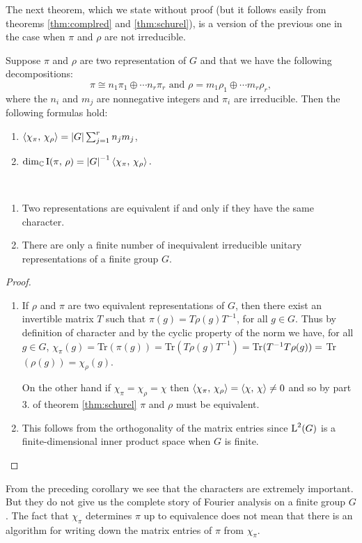 The next theorem, which we state without proof (but it follows easily from theorems \ref{thm:complred} and \ref{thm:schurel}), is a version of the previous one in the case when $\pi$ and $\rho$ are not irreducible.
\begin{theorem}
Suppose $\pi$ and $\rho$ are two representation of $G$ and that we have the following decompositions:
\[
\pi\cong n_1\pi_1\oplus\cdots n_r\pi_r\text{ and $\rho=m_1\rho_1\oplus\cdots m_r\rho_r,$}
\]
where the $n_i$ and $m_j$ are nonnegative integers and $\pi_i$ are irreducible. Then the following formulas hold:
\begin{enumerate}
\item $\braket{\chi_\pi,\, \chi_\rho}=\lvert G\rvert \sum_{j=1}^rn_jm_j$,
\item $ \dim_{\mathbb C}\operatorname{I}(\pi, \, \rho)={\lvert G\rvert}^{-1}\braket{\chi_\pi,\, \chi_\rho}.$
\end{enumerate}
\end{theorem}
\begin{cor}~ 
\begin{enumerate}
\item Two representations are equivalent if and only if they have the same character.
\item There are only a finite number of inequivalent irreducible unitary representations of a finite group $G$.
\end{enumerate}
\end{cor}
\begin{proof}~
\begin{enumerate}
\item If $\rho$ and $\pi$ are two equivalent representations of $G$, then there exist  an invertible matrix $T$ such that $\pi(g)=T\rho(g)T^{-1}$, for all $g\in G$. Thus by definition of character and by the cyclic property of the norm we have, for all $g\in G$, $\chi_\pi(g)=$Tr$(\pi(g))=$Tr$(T\rho(g)T^{-1})=$Tr$(T^{-1}T\rho(g))= \\
$Tr$(\rho(g))=\chi_\rho(g)$.

On the other hand if $\chi_\pi=\chi_\rho=\chi$ then $\braket{\chi_\pi,\, \chi_\rho}=\braket{\chi,\, \chi} \neq 0$ and so by part 3. of theorem \ref{thm:schurel} $\pi$ and $\rho$ must be equivalent.
\item  This  follows  from  the orthogonality  of  the matrix  entries  since $\operatorname{L}^{2}(G)$ is a finite-dimensional inner product  space when $G$ is finite.
\end{enumerate}

\end{proof}
From the preceding corollary we see that the characters are extremely important. But they do not give us the complete  story  of Fourier  analysis on a finite
group $G$. The fact that $\chi_\pi$ determines $\pi$ up to equivalence does not mean that there is an algorithm for writing down the matrix entries  of $\pi$ from $\chi_\pi$.
